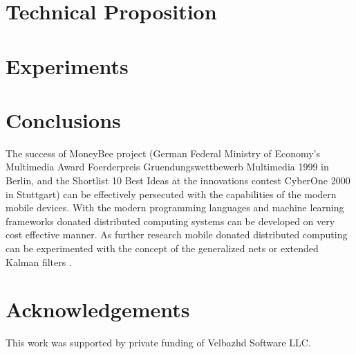 \documentclass{llncs}
\begin{document}
\section{Technical Proposition} \label{Technical Proposition}

\section{Experiments} \label{Experiments}

\section{Conclusions} \label{Conclusions}

The success of MoneyBee project (German Federal Ministry of Economy's Multimedia Award Foerderpreis Gruendungswettbewerb Multimedia 1999 in Berlin, and the Shortlist 10 Best Ideas at the innovations contest CyberOne 2000 in Stuttgart) can be effectively persecuted with the capabilities of the modern mobile devices. With the modern programming languages and machine learning frameworks donated distributed computing systems can be developed on very cost effective manner. As further research mobile donated distributed computing can be experimented with the concept of the generalized nets \cite{tashev01,tashev02} or extended Kalman filters \cite{alexandrov01}.


\section*{Acknowledgements}

This work was supported by private funding of Velbazhd Software LLC.

\end{document}
